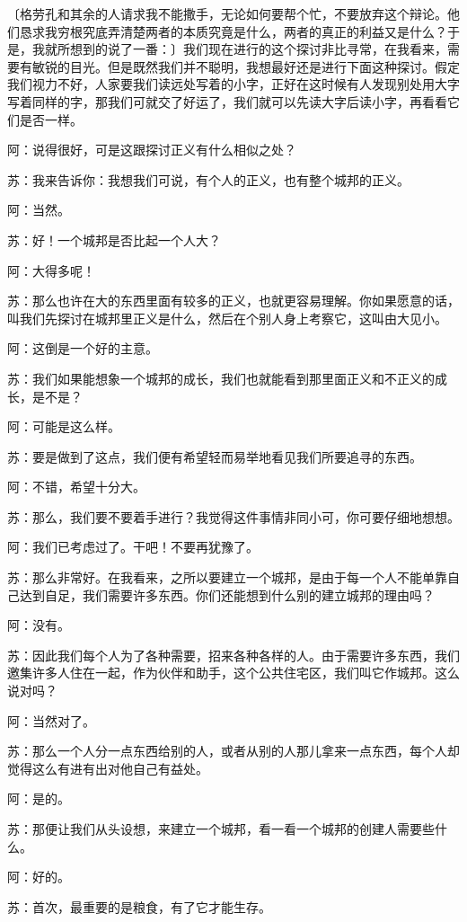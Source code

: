 \documentclass[11pt,oneside]{book}
\begin{document}
\begin{common-format}
〔格劳孔和其余的人请求我不能撒手，无论如何要帮个忙，不要放弃这个辩论。他们恳求我穷根究底弄清楚两者的本质究竟是什么，两者的真正的利益又是什么？于是，我就所想到的说了一番：〕我们现在进行的这个探讨非比寻常，在我看来，需要有敏锐的目光。但是既然我们并不聪明，我想最好还是进行下面这种探讨。假定我们视力不好，人家要我们读远处写着的小字，正好在这时候有人发现别处用大字写着同样的字，那我们可就交了好运了，我们就可以先读大字后读小字，再看看它们是否一样。

阿：说得很好，可是这跟探讨正义有什么相似之处？

苏：我来告诉你：我想我们可说，有个人的正义，也有整个城邦的正义。

阿：当然。

苏：好！一个城邦是否比起一个人大？

阿：大得多呢！

苏：那么也许在大的东西里面有较多的正义，也就更容易理解。你如果愿意的话，叫我们先探讨在城邦里正义是什么，然后在个别人身上考察它，这叫由大见小。

阿：这倒是一个好的主意。

苏：我们如果能想象一个城邦的成长，我们也就能看到那里面正义和不正义的成长，是不是？

阿：可能是这么样。

苏：要是做到了这点，我们便有希望轻而易举地看见我们所要追寻的东西。

阿：不错，希望十分大。

苏：那么，我们要不要着手进行？我觉得这件事情非同小可，你可要仔细地想想。

阿：我们已考虑过了。干吧！不要再犹豫了。

苏：那么非常好。在我看来，之所以要建立一个城邦，是由于每一个人不能单靠自己达到自足，我们需要许多东西。你们还能想到什么别的建立城邦的理由吗？

阿：没有。

苏：因此我们每个人为了各种需要，招来各种各样的人。由于需要许多东西，我们邀集许多人住在一起，作为伙伴和助手，这个公共住宅区，我们叫它作城邦。这么说对吗？

阿：当然对了。

苏：那么一个人分一点东西给别的人，或者从别的人那儿拿来一点东西，每个人却觉得这么有进有出对他自己有益处。

阿：是的。

苏：那便让我们从头设想，来建立一个城邦，看一看一个城邦的创建人需要些什么。

阿：好的。

苏：首次，最重要的是粮食，有了它才能生存。


\end{common-format}
\end{document}
